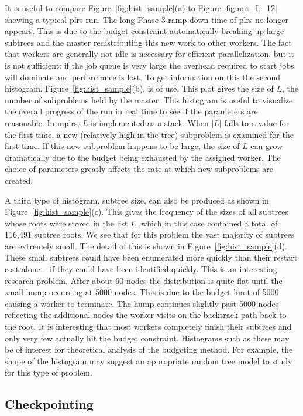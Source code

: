 \documentclass[a4paper,11pt]{article}   \usepackage{authblk} \usepackage[top=1.9cm,bottom=1.9cm,left=1.9cm,right=1.9cm]{geometry}
\newcommand{\progname}{\textsf}
\newcommand{\plrs}{\progname{plrs}\xspace}
\newcommand{\mplrs}{\progname{mplrs}\xspace}
\begin{document}
It is useful to compare Figure~\ref{fig:hist_sample}(a)
to Figure \ref{fig:mit_L_12}
showing a typical \plrs run. The long Phase 3 ramp-down
time of \plrs no longer appears. This is due to the budget constraint
automatically breaking up large subtrees and the master redistributing this 
new work to other workers.  The fact that workers are generally not idle  
is necessary for efficient parallelization, but it is
not sufficient: if the job queue is very large the overhead required to start
jobs will dominate and performance is lost. To get information on
this the second histogram,   
Figure~\ref{fig:hist_sample}(b), is of use.
This plot gives the size of $L$, the number of subproblems held by the
master. This histogram is useful to visualize the overall progress of the run
in real time
to see if the parameters are reasonable.
In \mplrs, $L$ is implemented as a stack.
When $|L|$ falls to a value for the first time, a new (relatively high in
the tree) subproblem is examined for the first time.  If this new subproblem
happens to be large, the size of $L$ can grow dramatically due
to the budget being exhausted by the assigned worker.  The choice of
parameters greatly affects the rate at which new subproblems are created.

A third type of histogram, subtree size, can also be produced as shown
in Figure~\ref{fig:hist_sample}(c). 
This gives the frequency of the sizes of all subtrees whose roots were stored in
the list $L$, which in this case contained a total of 116,491 subtree roots.
We see that for this problem the vast
majority of subtrees are extremely small. The detail of this is
shown in Figure~\ref{fig:hist_sample}(d). These small subtrees
could have been enumerated more quickly than their restart cost alone
 -- if they could have been identified quickly.
This is an interesting research problem.  After about 60 nodes the
distribution is quite flat until the small hump occurring at 5000 nodes.
This is due to the budget limit of 5000 causing a worker to terminate.
The hump continues slightly past 5000 nodes reflecting the additional
nodes the worker visits on the backtrack path back to the root.
It is interesting that most workers completely finish their
subtrees and only very few actually hit the budget constraint.
Histograms such as these may be of interest for
theoretical analysis of the budgeting method. For example, the shape of
the histogram may suggest an appropriate random tree model to study
for this type of problem.

\subsection{Checkpointing}
\label{subsec:checkp}
\end{document}
